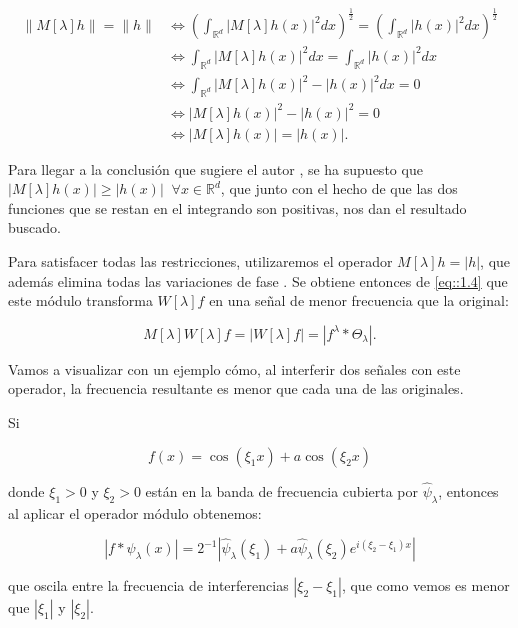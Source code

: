 \begin{align*}
  \|M[\lambda]h\|=\|h\| &\iff \left(\int_{\mathbb{R}^d} |M[\lambda]h (x)|^2 dx \right)^{\frac{1}{2}} =\left(\int_{\mathbb{R}^d} |h(x)|^2 dx \right)^{\frac{1}{2}} \\
  & \iff \int_{\mathbb{R}^d} |M[\lambda]h (x)|^2 dx=\int_{\mathbb{R}^d} |h(x)|^2 dx \\
  & \iff \int_{\mathbb{R}^d} |M[\lambda]h (x)|^2-|h(x)|^2 dx = 0 \\
  & \iff |M[\lambda]h (x)|^2 - |h(x)|^2 = 0 \\
  & \iff |M[\lambda]h (x)| = |h(x)|.
\end{align*}

\medskip

\noindent Para llegar a la conclusión que sugiere el autor \cite{GroupInvariantScattering}, se ha supuesto que $\left|M[\lambda]h(x) \right| \geq \left| h(x)\right| \;\; \forall x \in \mathbb{R}^d$, que junto con el hecho de que las dos funciones que se restan en el integrando son positivas, nos dan el resultado buscado.  

\medskip

\noindent Para satisfacer todas las restricciones, utilizaremos el operador $M[\lambda]h=|h|$, que además elimina todas las variaciones de fase \cite{bruna2013invariant}. Se obtiene entonces de \eqref{eq::1.4} que este módulo transforma $W[\lambda]f$ en una señal de menor frecuencia que la original:

$$M[\lambda]W[\lambda]f=|W[\lambda]f|=|f^\lambda \ast \Theta_\lambda|.$$

\noindent Vamos a visualizar con un ejemplo cómo, al interferir dos señales con este operador, la frecuencia resultante es menor que cada una de las originales. 

\medskip

\noindent Si 

$$f(x)=\cos(\xi_1 x)+a\cos(\xi_2 x)$$

\noindent donde $\xi_1 > 0$ y $\xi_2 > 0$ están en la banda de frecuencia cubierta por $\widehat{\psi}_\lambda$, entonces al aplicar el operador módulo obtenemos: 

$$|f \ast \psi_\lambda (x) |=2^{-1} |\widehat{\psi}_\lambda(\xi_1)+a\widehat{\psi}_\lambda(\xi_2)e^{i(\xi_2-\xi_1)x}|$$

\noindent que oscila entre la frecuencia de interferencias $|\xi_2-\xi_1|$, que como vemos es menor que $|\xi_1|$ y $|\xi_2|$.

\medskip

